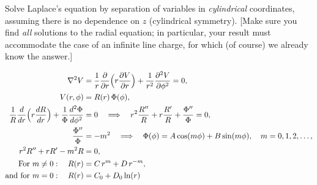 \begin{hwkProblem}{3.24}{}

	Solve Laplace's equation by separation of variables in \textit{cylindrical} coordinates, assuming there is no dependence on \( z \) (cylindrical symmetry). [Make sure you find \textit{all} solutions to the radial equation; in particular, your result must accommodate the case of an infinite line charge, for which (of course) we already know the answer.]

	\hwkSol{}

	\begin{align*}
		\nabla^2 V &= \frac{1}{r}\frac{\partial}{\partial r}\Bigl(r\frac{\partial V}{\partial r}\Bigr) + \frac{1}{r^2}\frac{\partial^2 V}{\partial \phi^2} = 0, \\
		V(r,\phi) &= R(r)\,\Phi(\phi), \\
		\frac{1}{R}\frac{d}{dr}\Bigl(r\frac{dR}{dr}\Bigr) + \frac{1}{\Phi}\frac{d^2\Phi}{d\phi^2} &= 0 
		\quad \Longrightarrow \quad r^2\frac{R''}{R}+r\frac{R'}{R} + \frac{\Phi''}{\Phi} = 0, \\
		\frac{\Phi''}{\Phi} &= -m^2 
		\quad \Longrightarrow \quad \Phi(\phi) = A\cos{m\phi}+B\sin{m\phi}, \quad m=0,1,2,\ldots, \\
		r^2R'' + rR' - m^2 R &= 0, \\
		\text{For } m\neq 0:\quad R(r) &= C\,r^m + D\,r^{-m}, \\
		\text{and for } m=0:\quad R(r) &= C_0 + D_0\ln r
	\end{align*}

\end{hwkProblem}

